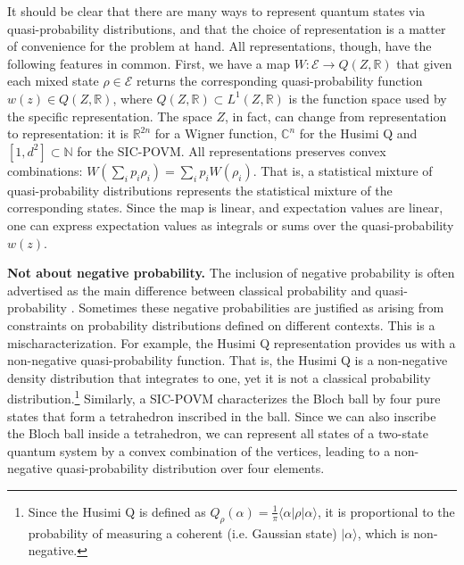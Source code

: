 \documentclass[10pt,twocolumn, nofootinbib]{revtex4-2}
\newcommand{\Ens}[1][E] {\mathcal{#1}} %
\begin{document}
It should be clear that there are many ways to represent quantum states via quasi-probability distributions, and that the choice of representation is a matter of convenience for the problem at hand. All representations, though, have the following features in common. First, we have a map $W : \Ens \to Q(Z,\mathbb{R})$ that given each mixed state $\rho \in \Ens$ returns the corresponding quasi-probability function $w(z) \in Q(Z,\mathbb{R})$, where $Q(Z,\mathbb{R}) \subset L^1(Z,\mathbb{R})$ is the function space used by the specific representation. The space $Z$, in fact, can change from representation to representation: it is $\mathbb{R}^{2n}$ for a Wigner function, $\mathbb{C}^n$ for the Husimi Q and $[1, d^2] \subset \mathbb{N}$ for the SIC-POVM. All representations preserves convex combinations: $W(\sum_i p_i \rho_i) = \sum_i p_i W(\rho_i)$. That is, a statistical mixture of quasi-probability distributions represents the statistical mixture of the corresponding states. Since the map is linear, and expectation values are linear, one can express expectation values as integrals or sums over the quasi-probability $w(z)$. 


\textbf{Not about negative probability.} The inclusion of negative probability is often advertised as the main difference between classical probability and quasi-probability \cite{adhikary2020}. Sometimes these negative probabilities are justified as arising from constraints on probability distributions defined on different contexts. This is a mischaracterization. For example, the Husimi Q representation provides us with a non-negative quasi-probability function. That is, the Husimi Q is a non-negative density distribution that integrates to one, yet it is not a classical probability distribution.\footnote{Since the Husimi Q is defined as $Q_{\rho} ( \alpha ) = \frac{1}{\pi} \langle \alpha | \rho | \alpha \rangle$, it is proportional to the probability of measuring a coherent (i.e. Gaussian state) $| \alpha \rangle$, which is non-negative. } Similarly, a SIC-POVM characterizes the Bloch ball by four pure states that form a tetrahedron inscribed in the ball. Since we can also inscribe the Bloch ball inside a tetrahedron, we can represent all states of a two-state quantum system by a convex combination of the vertices, leading to a non-negative quasi-probability distribution over four elements.
\end{document}
